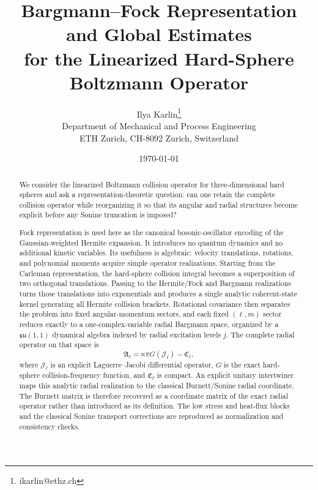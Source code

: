 \documentclass[11pt]{article}
\title{\textbf{Bargmann--Fock Representation and Global Estimates\\
for the Linearized Hard-Sphere Boltzmann Operator}}
\author{Ilya Karlin\thanks{ikarlin@ethz.ch}\\
Department of Mechanical and Process Engineering\\
ETH Zurich, CH-8092 Zurich, Switzerland}
\date{\today}
\numberwithin{equation}{section}
\theoremstyle{definition}
\begin{document}
\maketitle

\begin{abstract}
We consider the linearized Boltzmann collision operator
for three-dimensional hard spheres and ask a representation-theoretic
question: can one retain the complete collision operator while reorganizing it
so that its angular and radial structures become explicit before any Sonine
truncation is imposed?

Fock representation is used here as the canonical bosonic-oscillator
encoding of the Gaussian-weighted Hermite expansion.  It introduces no quantum
dynamics and no additional kinetic variables.  Its usefulness is algebraic:
velocity translations, rotations, and polynomial moments acquire simple
operator realizations.  Starting from the Carleman representation, the
hard-sphere collision integral becomes a superposition of two orthogonal
translations.  Passing to the Hermite/Fock and Bargmann realizations turns
those translations into exponentials and produces a single analytic
coherent-state kernel generating all Hermite collision brackets.  Rotational
covariance then separates the problem into fixed angular-momentum sectors,
and each fixed $(\ell,m)$ sector reduces exactly to a one-complex-variable
radial Bargmann space, organized by a $\mathfrak{su}(1,1)$ dynamical algebra indexed by radial excitation levels $j$.
The complete radial operator on that space is
\[
 \mathfrak A_\ell=\kappa\pi G(\mathcal J_\ell)-\mathfrak C_\ell,
\]
where $\mathcal J_\ell$ is an explicit Laguerre--Jacobi differential operator,
$G$ is the exact hard-sphere collision-frequency function, and
$\mathfrak C_\ell$ is compact.  An explicit unitary
intertwiner maps this analytic radial realization to the classical
Burnett/Sonine radial coordinate.  The Burnett matrix is therefore recovered
as a coordinate matrix of the exact radial operator rather than introduced as
its definition.  The low stress and heat-flux blocks and the classical Sonine
transport corrections are reproduced as normalization and consistency checks.


\end{abstract}
\end{document}
